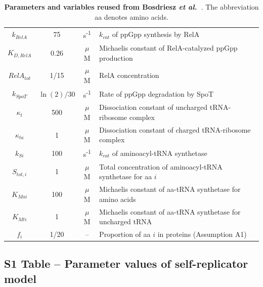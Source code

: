 \begin{table}[tb]
\begin{tabular}{cccl}
$k_{RelA}$ & 75 & s\textsuperscript{-1} & $k_{cat}$ of ppGpp synthesis by RelA\\

$K_{D,RelA}$ & 0.26 & $\mu$M & Michaelis constant of RelA-catalyzed ppGpp production\\

$RelA_{tot}$ & 1/15 & $\mu$M & RelA concentration\\

$k_{SpoT}$ & $\ln (2) / 30$ & s\textsuperscript{-1} & Rate of ppGpp degradation by SpoT\\

$\kappa_t$ & 500 & $\mu$M & Dissociation constant of uncharged tRNA-ribosome complex\\

$\kappa_{ta}$ & 1 & $\mu$M & Dissociation constant of charged tRNA-ribosome complex\\

$k_{Si}$ & 100 & s\textsuperscript{-1} & $k_{cat}$ of aminoacyl-tRNA synthetase\\

$S_{tot,i}$ & 1 & $\mu$M & Total concentration of aminoacyl-tRNA synthetase for aa $i$\\

$K_{Mai}$ & 100 & $\mu$M & Michaelis constant of aa-tRNA synthetase for amino acids\\

$K_{Mti}$ & 1 & $\mu$M & Michaelis constant of aa-tRNA synthetase for uncharged tRNA\\

$f_i$ & 1/20 & -- & Proportion of aa $i$ in proteins (Assumption A1)\\

\end{tabular}
\caption{\textbf{Parameters and variables reused from Bosdriesz \textit{et al.}~\cite{bosdriesz_how_2015}}. The abbreviation aa denotes amino acids.}
\label{tab:notations}
\end{table}

\clearpage

\subsection{S1 Table -- Parameter values of self-replicator model}


